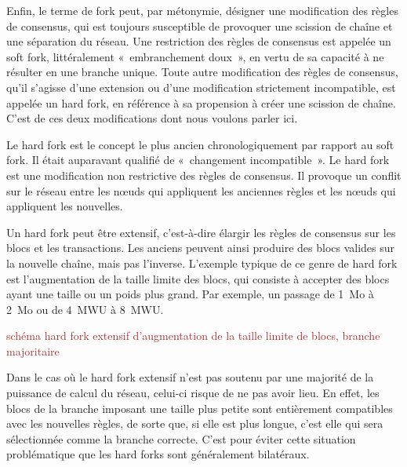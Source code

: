 Enfin, le terme de fork peut, par métonymie, désigner une modification des règles de consensus, qui est toujours susceptible de provoquer une scission de chaîne et une séparation du réseau. Une restriction des règles de consensus est appelée un soft fork, littéralement «~embranchement doux~», en vertu de sa capacité à ne résulter en une branche unique. Toute autre modification des règles de consensus, qu'il s'agisse d'une extension ou d'une modification strictement incompatible, est appelée un hard fork, en référence à sa propension à créer une scission de chaîne. C'est de ces deux modifications dont nous voulons parler ici.

%
Le hard fork est le concept le plus ancien chronologiquement par rapport au soft fork. Il était auparavant qualifié de «~changement incompatible~». Le hard fork est une modification non restrictive des règles de consensus. Il provoque un conflit sur le réseau entre les nœuds qui appliquent les anciennes règles et les nœuds qui appliquent les nouvelles.

Un hard fork peut être extensif, c'est-à-dire élargir les règles de consensus sur les blocs et les transactions. Les anciens peuvent ainsi produire des blocs valides sur la nouvelle chaîne, mais pas l'inverse. L'exemple typique de ce genre de hard fork est l'augmentation de la taille limite des blocs, qui consiste à accepter des blocs ayant une taille ou un poids plus grand. Par exemple, un passage de 1~Mo à 2~Mo ou de 4~MWU à 8~MWU.

\textcolor{brown}{schéma hard fork extensif d'augmentation de la taille limite de blocs, branche majoritaire}

Dans le cas où le hard fork extensif n'est pas soutenu par une majorité de la puissance de calcul du réseau, celui-ci risque de ne pas avoir lieu. En effet, les blocs de la branche imposant une taille plus petite sont entièrement compatibles avec les nouvelles règles, de sorte que, si elle est plus longue, c'est elle qui sera sélectionnée comme la branche correcte. C'est pour éviter cette situation problématique que les hard forks sont généralement bilatéraux.

